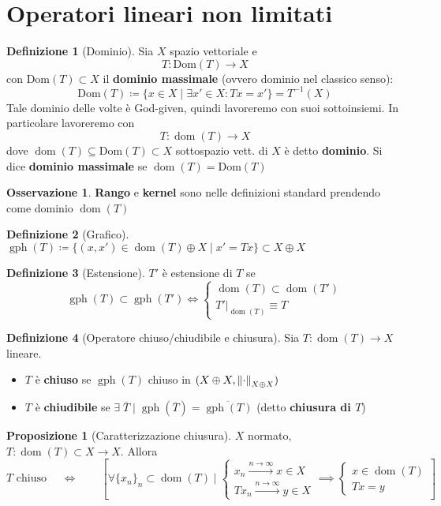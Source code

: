 \documentclass[a4paper,10pt]{article}
\theoremstyle{definition}
\DeclareMathOperator*{\dom}{dom} %
\DeclareMathOperator*{\gr}{gph} %
\theoremstyle{indentdefinition}
\newtheorem{defn}{Definizione}[section]
\theoremstyle{indenttheorem}
\newtheorem{prop}{Proposizione}
\theoremstyle{myremark}
\newtheorem*{rem*}{Osservazione}
\theoremstyle{indentgeneral}
\begin{document}
\pagebreak
\section{Operatori lineari non limitati}

\begin{defn}[Dominio]
Sia $X$ spazio vettoriale e $$T:\text{Dom}(T)\to X$$ con $\text{Dom}(T)\subset X$ il \textbf{dominio massimale} (ovvero dominio nel classico senso):
$$\text{Dom}(T)\coloneqq\{x\in X\mid \exists x'\in X: Tx=x'\}= T^{-1}(X)$$
Tale dominio delle  volte è God-given, quindi lavoreremo con suoi sottoinsiemi. In particolare lavoreremo con
$$T:\dom(T)\to X$$
dove $\dom(T)\subseteq \text{Dom}(T)\subset X$ sottospazio vett. di $X$ è detto \textbf{dominio}. Si dice \textbf{dominio massimale} se $\dom(T)= \text{Dom}(T)$
\end{defn}
\begin{rem*}
    \textbf{Rango} e \textbf{kernel} sono nelle definizioni standard prendendo come dominio $\dom(T)$
\end{rem*}

\begin{defn}[Grafico]
$\gr(T)\coloneqq\{(x,x')\in\dom(T)\oplus X\mid x'=Tx\}\subset X\oplus X$
\end{defn}

\begin{defn}[Estensione]
    $T'$ è estensione di $T$ se $$\gr(T)\subset \gr(T')\iff \begin{cases}
        \dom(T)\subset\dom(T')\\
        T'|_{\dom(T)}\equiv T
    \end{cases}$$
\end{defn}

\begin{defn}[Operatore chiuso/chiudibile e chiusura]
Sia $T:\dom(T)\to X$ lineare. 
\begin{itemize}
    \item $T$ è \textbf{chiuso} se $\gr(T)$ chiuso in $(X\oplus X,\norm{\cdot}_{X\oplus X})$
    \item $T$ è \textbf{chiudibile} se $\exists\;\overline{T}\mid\gr(\overline{T})=\overline{\gr(T)}$ (detto \textbf{chiusura di $T$})
\end{itemize}
\end{defn}

\begin{prop}[Caratterizzazione chiusura] \label{thm-caratt-chiusura}
    $X$ normato, $T:\dom(T)\subset X\to X$. Allora
$$T \text{ chiuso }\quad \iff\qquad \left[\forall\{x_n\}_{n}\subset\dom(T)\mid\begin{cases}
    x_n\overset{n\to\infty}{\longrightarrow}x\in X\\
    Tx_n\overset{n\to\infty}{\longrightarrow}y\in X
\end{cases}\implies\begin{cases}
    x\in\dom(T)\\
    Tx=y
\end{cases}\right]$$
\end{prop}
\end{document}
